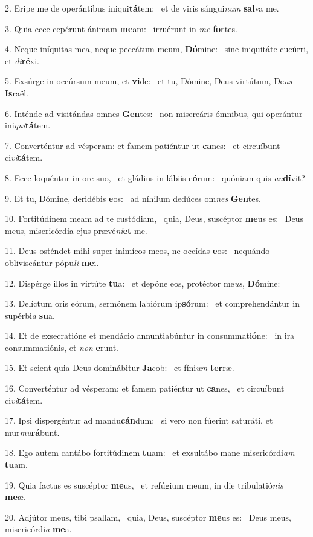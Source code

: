 2. Eripe me de operántibus iniqui\textbf{tá}tem: \ast\  et de viris sángui\textit{num} \textbf{sal}va me.\

3. Quia ecce cepérunt ánimam \textbf{me}am: \ast\  irruérunt in \textit{me} \textbf{for}tes.\

4. Neque iníquitas mea, neque peccátum meum, \textbf{Dó}mine: \ast\  sine iniquitáte cucúrri, et \textit{di}\textbf{ré}xi.\

5. Exsúrge in occúrsum meum, et \textbf{vi}de: \ast\  et tu, Dómine, Deus virtútum, De\textit{us} \textbf{Is}raël.\

6. Inténde ad visitándas omnes \textbf{Gen}tes: \ast\  non misereáris ómnibus, qui operántur ini\textit{qui}\textbf{tá}tem.\

7. Converténtur ad vésperam: et famem patiéntur ut \textbf{ca}nes: \ast\  et circuíbunt ci\textit{vi}\textbf{tá}tem.\

8. Ecce loquéntur in ore suo, \dag\  et gládius in lábiis e\textbf{ó}rum: \ast\  quóniam quis \textit{au}\textbf{dí}vit?\

9. Et tu, Dómine, deridébis \textbf{e}os: \ast\  ad níhilum dedúces om\textit{nes} \textbf{Gen}tes.\

10. Fortitúdinem meam ad te custódiam, \dag\  quia, Deus, suscéptor \textbf{me}us es: \ast\  Deus meus, misericórdia ejus prævé\textit{ni}\textbf{et} me.\

11. Deus osténdet mihi super inimícos meos, ne occídas \textbf{e}os: \ast\  nequándo obliviscántur pópu\textit{li} \textbf{me}i.\

12. Dispérge illos in virtúte \textbf{tu}a: \ast\  et depóne eos, protéctor me\textit{us}, \textbf{Dó}mine:\

13. Delíctum oris eórum, sermónem labiórum ip\textbf{só}rum: \ast\  et comprehendántur in supérbi\textit{a} \textbf{su}a.\

14. Et de exsecratióne et mendácio annuntiabúntur in consummati\textbf{ó}ne: \ast\  in ira consummatiónis, et \textit{non} \textbf{e}runt.\

15. Et scient quia Deus dominábitur \textbf{Ja}cob: \ast\  et fíni\textit{um} \textbf{ter}ræ.\

16. Converténtur ad vésperam: et famem patiéntur ut \textbf{ca}nes, \ast\  et circuíbunt ci\textit{vi}\textbf{tá}tem.\

17. Ipsi dispergéntur ad mandu\textbf{cán}dum: \ast\  si vero non fúerint saturáti, et mur\textit{mu}\textbf{rá}bunt.\

18. Ego autem cantábo fortitúdinem \textbf{tu}am: \ast\  et exsultábo mane misericórdi\textit{am} \textbf{tu}am.\

19. Quia factus es suscéptor \textbf{me}us, \ast\  et refúgium meum, in die tribulatió\textit{nis} \textbf{me}æ.\

20. Adjútor meus, tibi psallam, \dag\  quia, Deus, suscéptor \textbf{me}us es: \ast\  Deus meus, misericórdi\textit{a} \textbf{me}a.\

